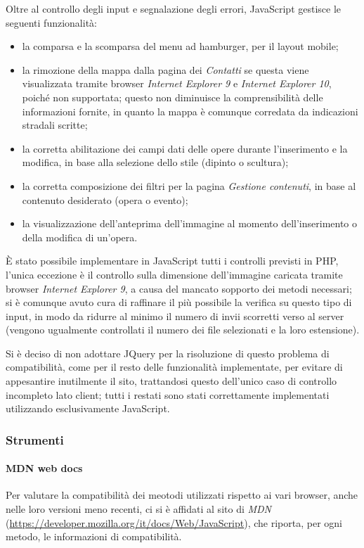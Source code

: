 Oltre al controllo degli input e segnalazione degli errori, JavaScript gestisce le seguenti funzionalità:
\begin{itemize}
	\item la comparsa e la scomparsa del menu ad hamburger, per il layout mobile;
	\item la rimozione della mappa dalla pagina dei \textit{Contatti} se questa viene visualizzata tramite browser \textit{Internet Explorer 9} e \textit{Internet Explorer 10}, poiché non supportata; questo non diminuisce la comprensibilità delle informazioni fornite, in quanto la mappa è comunque corredata da indicazioni stradali scritte;
	\item la corretta abilitazione dei campi dati delle opere durante l'inserimento e la modifica, in base alla selezione dello stile (dipinto o scultura);
	\item la corretta composizione dei filtri per la pagina \textit{Gestione contenuti}, in base al contenuto desiderato (opera o evento); 
	\item la visualizzazione dell'anteprima dell'immagine al momento dell'inserimento o della modifica di un'opera.
\end{itemize}


È stato possibile implementare in JavaScript tutti i controlli previsti in PHP, l'unica eccezione è il controllo sulla dimensione dell'immagine caricata tramite browser \textit{Internet Explorer 9}, a causa del mancato sopporto dei metodi necessari; si è comunque avuto cura di raffinare il più possibile la verifica su questo tipo di input, in modo da ridurre al minimo il numero di invii scorretti verso al server (vengono ugualmente controllati il numero dei file selezionati e la loro estensione).

Si è deciso di non adottare JQuery per la risoluzione di questo problema di compatibilità, come per il resto delle funzionalità implementate, per evitare di appesantire inutilmente il sito, trattandosi questo dell'unico caso di controllo incompleto lato client; tutti i restati sono stati correttamente implementati utilizzando esclusivamente JavaScript.


\subsubsection{Strumenti}
\label{implementazione-javascript-strumenti}

\paragraph{MDN web docs}
\label{implementazione-javascript-strumenti-mdn}
Per valutare la compatibilità dei meotodi utilizzati rispetto ai vari browser, anche nelle loro versioni meno recenti, ci si è affidati al sito di \textit{MDN} (\url{https://developer.mozilla.org/it/docs/Web/JavaScript}), che riporta, per ogni metodo, le informazioni di compatibilità.

